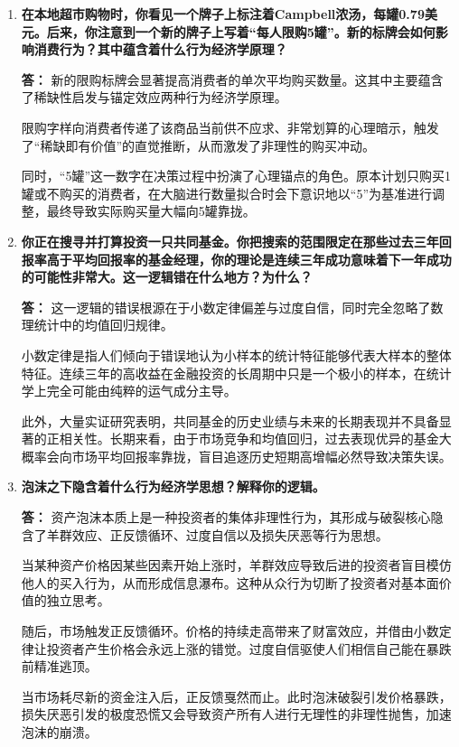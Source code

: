 \begin{enumerate}[label=\textbf{\arabic*.}, leftmargin=*]
\begin{center}
		\end{center}
		
		\item \textbf{在本地超市购物时，你看见一个牌子上标注着Campbell浓汤，每罐0.79美元。后来，你注意到一个新的牌子上写着“每人限购5罐”。新的标牌会如何影响消费行为？其中蕴含着什么行为经济学原理？}
		
		\textbf{答：}
		新的限购标牌会显著提高消费者的单次平均购买数量。这其中主要蕴含了稀缺性启发与锚定效应两种行为经济学原理。
		
		限购字样向消费者传递了该商品当前供不应求、非常划算的心理暗示，触发了“稀缺即有价值”的直觉推断，从而激发了非理性的购买冲动。
		
		同时，“5罐”这一数字在决策过程中扮演了心理锚点的角色。原本计划只购买1罐或不购买的消费者，在大脑进行数量拟合时会下意识地以“5”为基准进行调整，最终导致实际购买量大幅向5罐靠拢。
		\newpage
		\item \textbf{你正在搜寻并打算投资一只共同基金。你把搜索的范围限定在那些过去三年回报率高于平均回报率的基金经理，你的理论是连续三年成功意味着下一年成功的可能性非常大。这一逻辑错在什么地方？为什么？}
		
		\textbf{答：}
		这一逻辑的错误根源在于小数定律偏差与过度自信，同时完全忽略了数理统计中的均值回归规律。
		
		小数定律是指人们倾向于错误地认为小样本的统计特征能够代表大样本的整体特征。连续三年的高收益在金融投资的长周期中只是一个极小的样本，在统计学上完全可能由纯粹的运气成分主导。
		
		此外，大量实证研究表明，共同基金的历史业绩与未来的长期表现并不具备显著的正相关性。长期来看，由于市场竞争和均值回归，过去表现优异的基金大概率会向市场平均回报率靠拢，盲目追逐历史短期高增幅必然导致决策失误。
		
		\item \textbf{泡沫之下隐含着什么行为经济学思想？解释你的逻辑。}
		
		\textbf{答：}
		资产泡沫本质上是一种投资者的集体非理性行为，其形成与破裂核心隐含了羊群效应、正反馈循环、过度自信以及损失厌恶等行为思想。
		
		当某种资产价格因某些因素开始上涨时，羊群效应导致后进的投资者盲目模仿他人的买入行为，从而形成信息瀑布。这种从众行为切断了投资者对基本面价值的独立思考。
		
		随后，市场触发正反馈循环。价格的持续走高带来了财富效应，并借由小数定律让投资者产生价格会永远上涨的错觉。过度自信驱使人们相信自己能在暴跌前精准逃顶。
		
		当市场耗尽新的资金注入后，正反馈戛然而止。此时泡沫破裂引发价格暴跌，损失厌恶引发的极度恐慌又会导致资产所有人进行无理性的非理性抛售，加速泡沫的崩溃。
	\end{enumerate}
	\newpage
